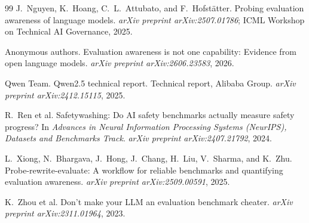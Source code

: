 \documentclass[11pt]{article}
\begin{document}
\begin{thebibliography}{99}
J.~Nguyen, K.~Hoang, C.~L.~Attubato, and F.~Hofst\"atter.
\newblock Probing evaluation awareness of language models.
\newblock \emph{arXiv preprint arXiv:2507.01786}; ICML Workshop on Technical AI
Governance, 2025.

Anonymous authors.
\newblock Evaluation awareness is not one capability: Evidence from open language
models.
\newblock \emph{arXiv preprint arXiv:2606.23583}, 2026.

Qwen Team.
\newblock Qwen2.5 technical report.
\newblock Technical report, Alibaba Group. \emph{arXiv preprint arXiv:2412.15115},
2025.

R.~Ren et al.
\newblock Safetywashing: Do AI safety benchmarks actually measure safety progress?
\newblock In \emph{Advances in Neural Information Processing Systems (NeurIPS),
Datasets and Benchmarks Track}. \emph{arXiv preprint arXiv:2407.21792}, 2024.

L.~Xiong, N.~Bhargava, J.~Hong, J.~Chang, H.~Liu, V.~Sharma, and K.~Zhu.
\newblock Probe-rewrite-evaluate: A workflow for reliable benchmarks and
quantifying evaluation awareness.
\newblock \emph{arXiv preprint arXiv:2509.00591}, 2025.

K.~Zhou et al.
\newblock Don't make your LLM an evaluation benchmark cheater.
\newblock \emph{arXiv preprint arXiv:2311.01964}, 2023.

\end{thebibliography}
\end{document}
